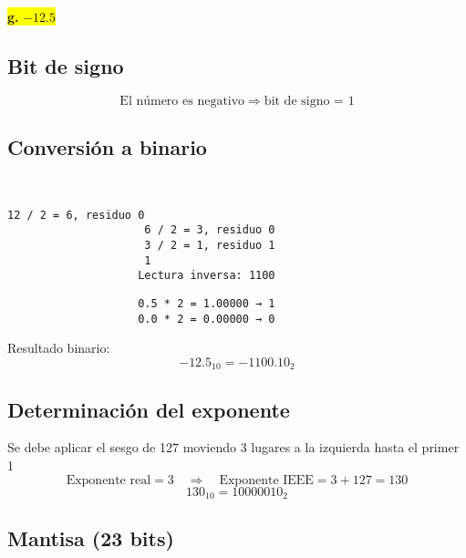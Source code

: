 \documentclass[a4paper,12pt]{article}
\begin{document}
			\begin{center}	
			\colorbox{yellow}{{\textbf{g.} $-12.5$}}
			
			\subsection*{Bit de signo}
			
			\[
			\text{El número es negativo} \Rightarrow \text{bit de signo = } \boxed{1}
			\]
			
			\subsection*{Conversión a binario}
			
			
			~~~~~~~~~~~~~~~~~~~~~~~~~ 
			\begin{center}
				\begin{Verbatim}[formatcom=\centering]
					12 / 2 = 6, residuo 0
					 6 / 2 = 3, residuo 0
					 3 / 2 = 1, residuo 1
					 1 
					Lectura inversa: 1100
				\end{Verbatim}
			\end{center}
			
			
			\begin{center}
				\begin{Verbatim}
					0.5 * 2 = 1.00000 → 1 
					0.0 * 2 = 0.00000 → 0 
				\end{Verbatim}
			\end{center}
			
			Resultado binario: 
			\[
			-12.5_{10} = -1100.10_2
			\]
			
			\subsection*{Determinación del exponente}
			
			Se debe aplicar el sesgo de 127 moviendo 3 lugares a la izquierda hasta el primer 1
			\vspace{-0.5em}
			\[
			\text{Exponente real} = 3 \quad \Rightarrow \quad \text{Exponente IEEE} = 3 + 127 = 130
			\]
			\vspace{-0.5em}
			\[
			130_{10} = 10000010_2
			\]
			
			\subsection*{Mantisa (23 bits)}
			

\end{center}
\end{document}
